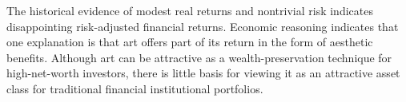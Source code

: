 \documentclass[11pt]{article}
\begin{document}
The historical evidence of modest real returns and nontrivial risk indicates disappointing risk-adjusted financial returns. Economic reasoning indicates that one explanation is that art offers part of its return in the form of aesthetic benefits. Although art can be attractive as a wealth-preservation technique for high-net-worth investors, there is little basis for viewing it as an attractive asset class for traditional financial institutional portfolios.
\end{document}

